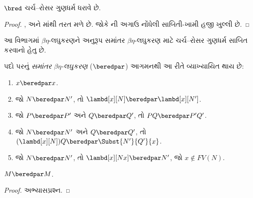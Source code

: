 \begin{thm}
  $\bred$ ચર્ચ--રોસર ગુણધર્મ ધરાવે છે.
\end{thm}

\begin{proof}
  ,  અને
  માંથી તરત મળે છે. જોકે
  ની અગાઉ નોંધેલી સાબિતી-ખામી
  હજી ખુલ્લી છે.
\end{proof}
\endgroup

\begingroup
\makeatletter{}\makeatother


\label{guunit:OLP-0371}


આ વિભાગમાં $\beta\eta$-લઘુકરણને અનુરૂપ સમાંતર
$\beta\eta$-લઘુકરણ માટે ચર્ચ--રોસર ગુણધર્મ
સાબિત કરવાનો હેતુ છે.

\begin{defn} 
  પદો પરનું \emph{સમાંતર $\beta\eta$-લઘુકરણ}
  ($\beredpar$) આગમનથી આ રીતે વ્યાખ્યાયિત થાય છે:
  \begin{enumerate}
    \item {} $x \beredpar x$.
    \item {} જો $N \beredpar N'$,
      તો $\lambd[x][N] \beredpar \lambd[x][N']$.
    \item {} જો $P \beredpar P'$ અને
      $Q \beredpar Q'$, તો $PQ \beredpar P'Q'$.
    \item {} જો $N \beredpar N'$ અને
      $Q \beredpar Q'$, તો
      $(\lambd[x][N])Q \beredpar \Subst{N'}{Q'}{x}$.
    \item {} જો $N \beredpar N'$,
      તો $\lambd[x][Nx] \beredpar N'$, જો
      $x \notin FV(N)$.
  \end{enumerate}
\end{defn}

\begin{thm}
  $M \beredpar M$.
\end{thm}

\begin{proof}
  અભ્યાસપ્રશ્ન.
\end{proof}

